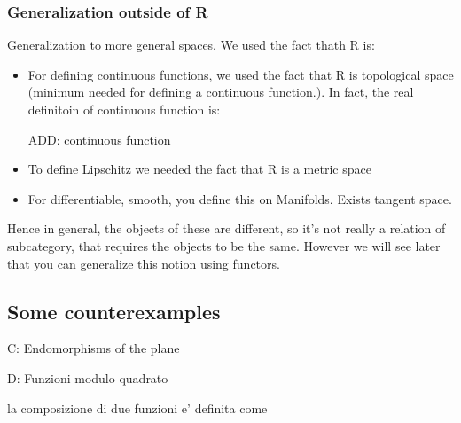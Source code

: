 \subsubsection{Generalization outside of R}
Generalization to more general spaces. 
We used the fact thath R is:
\begin{itemize}
\item For defining continuous functions, we used the fact that R is topological space (minimum needed for defining a continuous function.). In fact, the real definitoin of continuous function is: 

ADD: continuous function

\item To define Lipschitz we needed the fact that R is a metric space 
\item For differentiable, smooth, you define this on Manifolds. Exists tangent space. 
\end{itemize}
     
Hence in general, the objects of these are different, so it's not really a relation of subcategory, that requires
the objects to be the same. However we will see later that you can generalize this notion using functors. 





\subsection{Some counterexamples}

C: Endomorphisms of the plane




D: Funzioni modulo quadrato


la composizione di due funzioni e' definita come

  
  

           
           
